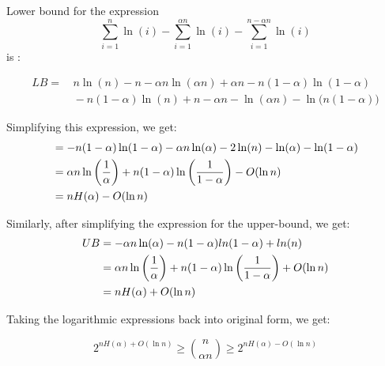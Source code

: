 \documentclass[12pt]{article}
\begin{document}
\begin{solution}
Lower bound for the expression \[ \sum_{i=1}^{n} \ln(i) - \sum_{i=1}^{\alpha n} \ln(i) - \sum_{i=1}^{n - \alpha n }\ln(i)\] is : 

\begin{align*}
LB
=& \, n\ln(n) - n 
- \alpha n\ln(\alpha n) + \alpha n
- n(1-\alpha )\ln(1-\alpha) \\
 &\, -n(1- \alpha)\ln(n)
+ n - \alpha n 
- \ln(\alpha n)
- \ln\!\bigl(n(1-\alpha)\bigr)    
\end{align*}



Simplifying this expression, we get: 
\begin{align*}
&= -n(1-\alpha)\ln(1-\alpha)  -\alpha n\ln(\alpha) - 2\ln(n)- \ln(\alpha)-\ln(1-\alpha) \\
&= \alpha n\ln\left(\frac{1}{\alpha}\right) + n(1- \alpha)\ln\left(\frac{1}{1-\alpha}\right) - O(\ln n)\\
&= nH(\alpha)- O(\ln n)
\end{align*}


Similarly, after simplifying the expression for the upper-bound, we get: 
\begin{align*}
UB &= -\alpha n\ln(\alpha) -n(1-\alpha)ln(1-\alpha) + ln(n) \\
&= \alpha n\ln\left(\frac{1}{\alpha}\right) + n(1- \alpha)\ln\left(\frac{1}{1-\alpha}\right)  + O(\ln n)\\
&= nH(\alpha)+ O(\ln n)
\end{align*}

Taking the logarithmic expressions back into original form,  we get: 

\[2^{nH(\alpha)+ O(\ln n)}\geq \binom{n}{\alpha n} \geq 2^{nH(\alpha)- O(\ln n)}\]

\end{solution}
\end{document}
